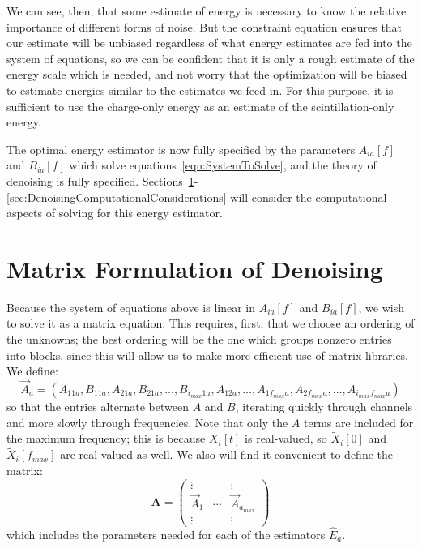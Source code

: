 We can see, then, that some estimate of energy is necessary to know the relative importance of different forms of noise.  But the constraint equation ensures that our estimate will be unbiased regardless of what energy estimates are fed into the system of equations, so we can be confident that it is only a rough estimate of the energy scale which is needed, and not worry that the optimization will be biased to estimate energies similar to the estimates we feed in.  For this purpose, it is sufficient to use the charge-only energy as an estimate of the scintillation-only energy.

The optimal energy estimator is now fully specified by the parameters $A_{ia}[f]$ and $B_{ia}[f]$ which solve equations~\ref{eqn:SystemToSolve}, and the theory of denoising is fully specified.  Sections~\ref{sec:MatrixFormulationOfDenoising}-\ref{sec:DenoisingComputationalConsiderations} will consider the computational aspects of solving for this energy estimator.

\section{Matrix Formulation of Denoising}\label{sec:MatrixFormulationOfDenoising}

Because the system of equations above is linear in $A_{ia}[f]$ and $B_{ia}[f]$, we wish to solve it as a matrix equation.  This requires, first, that we choose an ordering of the unknowns; the best ordering will be the one which groups nonzero entries into blocks, since this will allow us to make more efficient use of matrix libraries.  We define:
\begin{equation}
\vec{A}_a = (A_{1 1 a}, B_{1 1 a}, A_{2 1 a}, B_{2 1 a}, \dots, B_{i_{max} 1 a}, A_{1 2 a}, \dots, A_{1 f_{max} a}, A_{2 f_{max} a}, \dots, A_{i_{max} f_{max} a})
\end{equation}
so that the entries alternate between $A$ and $B$, iterating quickly through channels and more slowly through frequencies.  Note that only the $A$ terms are included for the maximum frequency; this is because $X_i[t]$ is real-valued, so $\widetilde{X}_i[0]$ and $\widetilde{X}_i[f_{max}]$ are real-valued as well.  We also will find it convenient to define the matrix:
\begin{equation}
\mathbf{A} = \begin{pmatrix}
\vdots & & \vdots \\
\vec{A}_1 & \cdots & \vec{A}_{a_{max}} \\
\vdots & & \vdots
\end{pmatrix}
\end{equation}
which includes the parameters needed for each of the estimators $\widehat{E}_a$.

